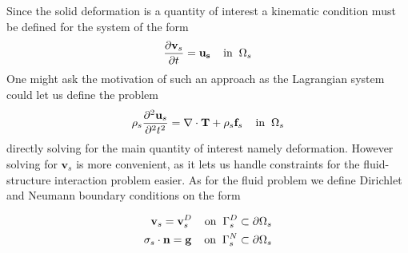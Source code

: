 Since the solid deformation is a quantity of interest a kinematic condition must be defined for the system of the form
\begin{align}
\frac{\partial \mathbf{v}_s}{\partial t} = \mathbf{u_s} \hspace{4mm} \text{in} \hspace{2mm} \Omega_s
\end{align} 
One might ask the motivation of such an approach as the Lagrangian system could let us define the problem 
\begin{align}
\rho_s \frac{\partial^2 \mathbf{u}_s}{\partial^2 t^2} = \nabla \cdot \mathbf{T} + \rho_s \mathbf{f}_s
\hspace{4mm} \text{in} \hspace{2mm} \Omega_s
\end{align}
directly solving for the main quantity of interest namely deformation. However solving for $\mathbf{v}_s$ is more convenient, as it lets us handle constraints for the fluid-structure interaction problem easier. As for the fluid problem we define Dirichlet and Neumann boundary conditions on the form

\begin{align*}
\mathbf{v}_s = \mathbf{v}_s^D 
\hspace{4mm} \text{on} \hspace{2mm} \Gamma_s^D \subset \partial \Omega_s  \\
\sigma_s \cdot \mathbf{n} = \mathbf{g}  
\hspace{4mm} \text{on} \hspace{2mm} \Gamma_s^N \subset \partial \Omega_s 
\end{align*}



